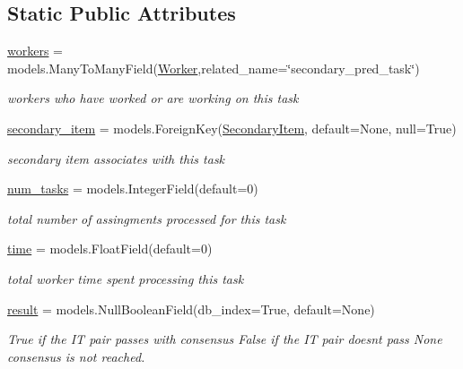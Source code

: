 \subsection*{Static Public Attributes}
\begin{DoxyCompactItemize}
\item 
\mbox{\hyperlink{classjoinapp_1_1models_1_1task__management__models_1_1_sec_pred_task_a42a0cd7f4a34b940f08fd182458c9aba}{workers}} = models.\+Many\+To\+Many\+Field(\mbox{\hyperlink{classjoinapp_1_1models_1_1task__management__models_1_1_worker}{Worker}},related\+\_\+name=\char`\"{}secondary\+\_\+pred\+\_\+task\char`\"{})
\begin{DoxyCompactList}\small\item\em workers who have worked or are working on this task \end{DoxyCompactList}\item 
\mbox{\hyperlink{classjoinapp_1_1models_1_1task__management__models_1_1_sec_pred_task_a0a9178a9cf48b964cab2025b9788a615}{secondary\+\_\+item}} = models.\+Foreign\+Key(\textquotesingle{}\mbox{\hyperlink{classjoinapp_1_1models_1_1items_1_1_secondary_item}{Secondary\+Item}}\textquotesingle{}, default=None, null=True)
\begin{DoxyCompactList}\small\item\em secondary item associates with this task \end{DoxyCompactList}\item 
\mbox{\hyperlink{classjoinapp_1_1models_1_1task__management__models_1_1_sec_pred_task_afc259a6f918180e978f96108b03d3411}{num\+\_\+tasks}} = models.\+Integer\+Field(default=0)
\begin{DoxyCompactList}\small\item\em total number of assingments processed for this task \end{DoxyCompactList}\item 
\mbox{\hyperlink{classjoinapp_1_1models_1_1task__management__models_1_1_sec_pred_task_a70c092a6aebace0b1ea406e14da78a40}{time}} = models.\+Float\+Field(default=0)
\begin{DoxyCompactList}\small\item\em total worker time spent processing this task \end{DoxyCompactList}\item 
\mbox{\hyperlink{classjoinapp_1_1models_1_1task__management__models_1_1_sec_pred_task_a937d4dd628a8858b443a399410d2600b}{result}} = models.\+Null\+Boolean\+Field(db\+\_\+index=True, default=None)
\begin{DoxyCompactList}\small\item\em True if the IT pair passes with consensus False if the IT pair doesn\textquotesingle{}t pass None consensus is not reached. \end{DoxyCompactList}\item 

\end{DoxyCompactItemize}

